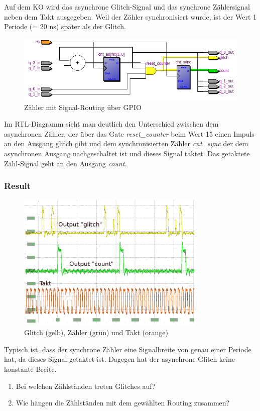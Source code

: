 Auf dem KO wird das asynchrone Glitch-Signal und das synchrone Zählersignal neben dem Takt ausgegeben. Weil der Zähler synchronisiert wurde, ist der Wert 1 Periode (= 20 ns) später als der Glitch.\\

\begin{figure}[H]
	\centering
	\includegraphics[width=\textwidth]{images/RTL_glitch_detection_bemalt.png}
	\caption{Zähler mit Signal-Routing über GPIO}
	\label{fig.glitch.routing}
\end{figure}
Im RTL-Diagramm sieht man deutlich den Unterschied zwischen dem asynchronen Zähler, der über das Gate \textit{reset\_{counter}} beim Wert 15 einen Impuls an den Ausgang glitch gibt und dem synchronisierten Zähler \textit{cnt\_{sync}} der dem asynchronen Ausgang nachgeschaltet ist und dieses Signal taktet. Das getaktete Zähl-Signal geht an den Ausgang \textit{count}.

\subsubsection{Result} 
\begin{figure}[H]
	\centering
	\includegraphics[width=0.8\textwidth]{images/Glitch_2_good_kommentar.png}
	\caption{Glitch (gelb), Zähler (grün) und Takt (orange)}
	\label{fig.glitch.result_1}
\end{figure}

Typisch ist, dass der synchrone Zähler eine Signalbreite von genau einer Periode hat, da dieses Signal getaktet ist. Dagegen hat der asynchrone Glitch keine konstante Breite.
\begin{enumerate}
	\item{Bei welchen Zählständen treten Glitches auf?}

	\item{Wie hängen die Zählständen mit dem gewählten Routing zusammen?}

\end{enumerate}
	
